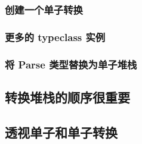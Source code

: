 \documentclass[./main.tex]{subfiles}
\begin{document}
\begin{lstlisting}[language=Haskell]

\end{lstlisting}



\begin{lstlisting}[language=Haskell]

\end{lstlisting}



\begin{lstlisting}[language=Haskell]

\end{lstlisting}



\begin{lstlisting}[language=Haskell]

\end{lstlisting}



\begin{lstlisting}[language=Haskell]

\end{lstlisting}



\begin{lstlisting}[language=Haskell]

\end{lstlisting}

\subsubsection*{创建一个单子转换}
\subsubsection*{更多的 typeclass 实例}

\subsubsection*{将 Parse 类型替换为单子堆栈}

\subsection*{转换堆栈的顺序很重要}

\subsection*{透视单子和单子转换}
\end{document}
